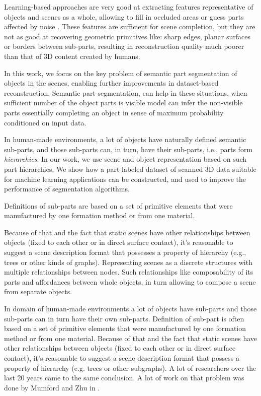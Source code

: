 Learning-based approaches are very good at extracting features representative of objects and scenes as a whole, allowing to fill in occluded areas or guess parts affected by noise \cite{dai2017shape,dai2018scancomplete,song2017semantic}. These features are sufficient for scene completion, but they are not as good at recovering geometric primitives like: sharp edges, planar surfaces or borders between sub-parts, resulting in reconstruction quality much poorer than that of 3D content created by humans.

In this work, we focus on the key problem of semantic part segmentation of objects in the scenes, enabling further improvements in  dataset-based reconstruction. 
Semantic part-segmentation, can help in these situations, when sufficient number of the object parts is visible model can infer the non-visible parts essentially completing an object in sense of maximum probability conditioned on input data.

In human-made environments, a lot of objects have naturally defined semantic sub-parts, and those sub-parts can, in turn, have their sub-parts, i.e., parts form \emph{hierarchies}.  In our work, we use scene and object representation based on such part hierarchies.  We show how a part-labeled dataset of scanned 3D data suitable for machine learning applications can be constructed, and used to improve the performance of segmentation algorithms. 

Definitions of sub-parts are based on a set of primitive elements that were manufactured by one formation method or from one material.

Because of that and the fact that static scenes have other relationships between objects (fixed to each other or in direct surface contact), it's reasonable to suggest a scene description format that possesses a property of hierarchy (e.g., trees or other kinds of graphs).
Representing scenes as a discrete structures with multiple relationships between nodes. Such relationships like composability of its parts and affordances between whole objects, in turn allowing to compose a scene from separate objects.


In domain of human-made environments a lot of objects have sub-parts and those sub-parts can in turn have their own sub-parts. Definition of sub-part is often based on a set of primitive elements that were manufactured by one formation method or from one material. Because of that and the fact that static scenes have other relationships between objects (fixed to each other or in direct surface contact), it's reasonable to suggest a scene description format that possess a property of hierarchy (e.g. trees or other subgraphs).
A lot of researchers over the last 20 years came to the same conclusion. A lot of work on that problem was done by Mumford and Zhu in \cite{zhu2006stochastic}.


